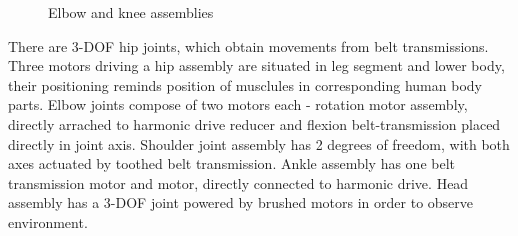 \documentclass[letterpaper, 10 pt, conference]{ieeeconf}  %
\begin{document}
\begin{figure}[h]
\caption{Elbow and knee assemblies}
\label{img:joints}
\end{figure}

There are 3-DOF hip joints, which obtain movements from belt transmissions.
Three motors driving a hip assembly are situated in leg segment and lower body,
their positioning reminds position of musclules in corresponding human body
parts.
Elbow joints compose of two motors each - rotation motor assembly, directly
arrached to harmonic drive reducer and flexion belt-transmission placed directly
in joint axis.
Shoulder joint assembly has 2 degrees of freedom, with both axes actuated by
toothed belt transmission.
Ankle assembly has one belt transmission motor and motor, directly connected
to harmonic drive. Head assembly has a 3-DOF joint powered by brushed
motors in order to observe environment.
\end{document}
